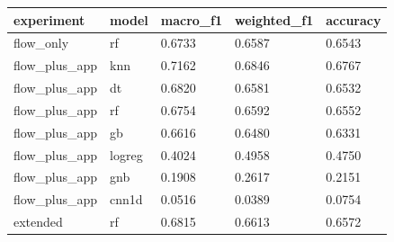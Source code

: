 \begin{tabular}{lllll}
\toprule
   experiment &  model & macro\_f1 & weighted\_f1 & accuracy \\
\midrule
    flow\_only &     rf &   0.6733 &      0.6587 &   0.6543 \\
flow\_plus\_app &    knn &   0.7162 &      0.6846 &   0.6767 \\
flow\_plus\_app &     dt &   0.6820 &      0.6581 &   0.6532 \\
flow\_plus\_app &     rf &   0.6754 &      0.6592 &   0.6552 \\
flow\_plus\_app &     gb &   0.6616 &      0.6480 &   0.6331 \\
flow\_plus\_app & logreg &   0.4024 &      0.4958 &   0.4750 \\
flow\_plus\_app &    gnb &   0.1908 &      0.2617 &   0.2151 \\
flow\_plus\_app &  cnn1d &   0.0516 &      0.0389 &   0.0754 \\
     extended &     rf &   0.6815 &      0.6613 &   0.6572 \\
\bottomrule
\end{tabular}
